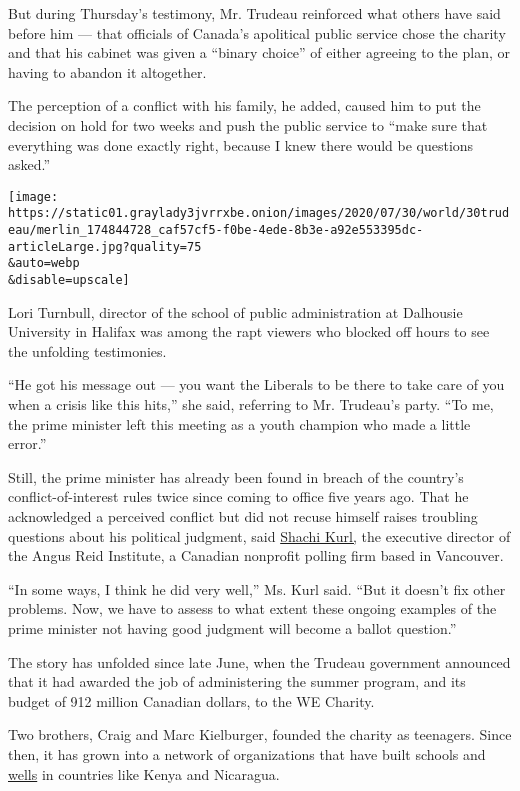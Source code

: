 But during Thursday's testimony, Mr. Trudeau reinforced what others have
said before him --- that officials of Canada's apolitical public service
chose the charity and that his cabinet was given a ``binary choice'' of
either agreeing to the plan, or having to abandon it altogether.

The perception of a conflict with his family, he added, caused him to
put the decision on hold for two weeks and push the public service to
``make sure that everything was done exactly right, because I knew there
would be questions asked.''

\texttt{[image: https://static01.graylady3jvrrxbe.onion/images/2020/07/30/world/30trudeau/merlin\_174844728\_caf57cf5-f0be-4ede-8b3e-a92e553395dc-articleLarge.jpg?quality=75\\\&auto=webp\\\&disable=upscale]}

Lori Turnbull, director of the school of public administration at
Dalhousie University in Halifax was among the rapt viewers who blocked
off hours to see the unfolding testimonies.

``He got his message out --- you want the Liberals to be there to take
care of you when a crisis like this hits,'' she said, referring to Mr.
Trudeau's party. ``To me, the prime minister left this meeting as a
youth champion who made a little error.''

Still, the prime minister has already been found in breach of the
country's conflict-of-interest rules twice since coming to office five
years ago. That he acknowledged a perceived conflict but did not recuse
himself raises troubling questions about his political judgment, said
\href{https://twitter.com/ShachiKurl?ref_src=twsrc\%5Egoogle\%7Ctwcamp\%5Eserp\%7Ctwgr\%5Eauthor}{Shachi
Kurl,} the executive director of the Angus Reid Institute, a Canadian
nonprofit polling firm based in Vancouver.

``In some ways, I think he did very well,'' Ms. Kurl said. ``But it
doesn't fix other problems. Now, we have to assess to what extent these
ongoing examples of the prime minister not having good judgment will
become a ballot question.''

The story has unfolded since late June, when the Trudeau government
announced that it had awarded the job of administering the summer
program, and its budget of 912 million Canadian dollars, to the WE
Charity.

Two brothers, Craig and Marc Kielburger, founded the charity as
teenagers. Since then, it has grown into a network of organizations that
have built schools and
\href{https://www.metowe.com/2016/09/09/power-clean-water/}{wells} in
countries like Kenya and Nicaragua.

